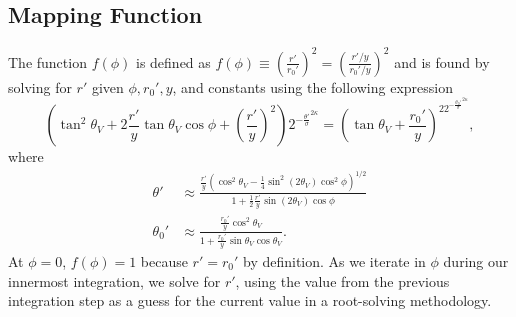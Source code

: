 \documentclass[11pt,twoside,letterpaper]{report}
\begin{document}
\subsection{Mapping Function}
The function $f(\phi)$ is defined as $f(\phi) \equiv \left( \frac{r'}{r_0'} \right)^2 = \left( \frac{r'/y}{r_0'/y} \right)^2$ and is found by solving for $r'$ given $\phi, r_0', y$, and constants using the following expression
\begin{equation}
\left(\tan^2 \theta_V + 2\frac{r'}{y}\tan \theta_V \cos \phi + \left(\frac{r'}{y}\right)^2\right)2^{-\frac{\theta'}{\sigma}^{2\kappa}} = \left(\tan \theta_V + \frac{r_0'}{y}\right)^22^{-\frac{\theta_0'}{\sigma}^{2\kappa}},
\end{equation}
where
\begin{align}
\theta' &\approx \frac{\frac{r'}{y}\left( \cos^2 \theta_V - \frac{1}{4}\sin^2 (2\theta_V) \cos^2 \phi  \right)^{1/2}}{1 + \frac{1}{2}\frac{r'}{y}\sin (2\theta_V) \cos \phi} \\
\theta_0' &\approx \frac{\frac{r_0'}{y} \cos^2\theta_V}{1 + \frac{r_0'}{y}\sin \theta_V \cos \theta_V}.
\end{align}
At $\phi = 0$, $f(\phi) = 1$ because $r' = r_0'$ by definition. As we iterate in $\phi$ during our innermost integration, we solve for $r'$, using the value from the previous integration step as a guess for the current value in a root-solving methodology.
\end{document}
